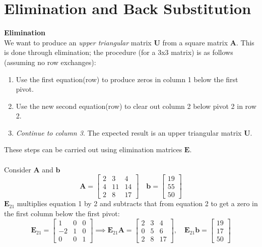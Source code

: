 \documentclass{report}
\begin{document}
\section{Elimination and Back Substitution}
\textbf{Elimination}\\
We want to produce an \textit{upper triangular} matrix $\bm U$ from a square matrix $\bm A$. This is done through elimination; the procedure (for a 3x3 matrix) is as
follows (assuming no row exchanges):
\begin{enumerate}
\item Use the first equation(row) to produce zeros in column 1 below the first pivot.
\item Use the new second equation(row) to clear out column 2 below pivot 2 in row 2.
\item \textit{Continue to column 3}. The expected result is an upper triangular matrix $\bm U$.
\end{enumerate}
These steps can be carried out using elimination matrices $\bm E$.\\
\vspace{1mm}\\
Consider $\bm A$ and $\bm b$
\begin{equation*}
\bm A=\left[\begin{array}{ccc}
2&3&4\\
4&11&14\\
2&8&17
\end{array}\right]\quad
\bm b=\left[\begin{array}{c}
19\\55\\50
\end{array}\right]
\end{equation*}
$\bm E_{21}$ multiplies equation 1 by 2 and subtracts that from equation 2 to get a zero in the first column below the first pivot:
\begin{equation*}
\bm E_{21}=\left[\begin{array}{ccc}
1&0&0\\
-2&1&0\\
0&0&1
\end{array}\right]\implies
\bm E_{21}\bm A=\left[\begin{array}{ccc}
2&3&4\\
0&5&6\\
2&8&17
\end{array}\right],\quad
\bm E_{21}\bm b=\left[\begin{array}{c}
19\\17\\50
\end{array}\right]
\end{equation*}
\end{document}
